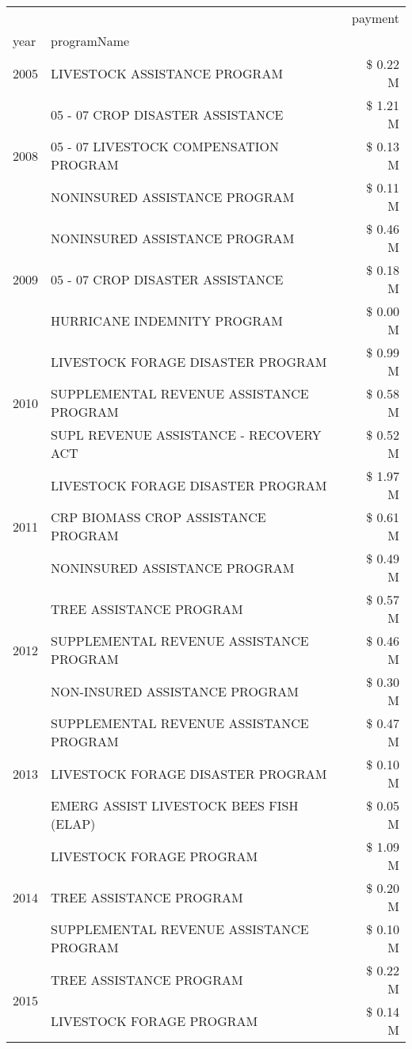 \begin{tabular}{llr}
\toprule
 &  & payment \\
year & programName &  \\
\midrule
2005 & LIVESTOCK ASSISTANCE PROGRAM & \$ 0.22 M \\
\cline{1-3}
\multirow[t]{3}{*}{2008} & 05 - 07 CROP DISASTER ASSISTANCE & \$ 1.21 M \\
 & 05 - 07 LIVESTOCK COMPENSATION PROGRAM & \$ 0.13 M \\
 & NONINSURED ASSISTANCE PROGRAM & \$ 0.11 M \\
\cline{1-3}
\multirow[t]{3}{*}{2009} & NONINSURED ASSISTANCE PROGRAM & \$ 0.46 M \\
 & 05 - 07 CROP DISASTER ASSISTANCE & \$ 0.18 M \\
 & HURRICANE INDEMNITY PROGRAM & \$ 0.00 M \\
\cline{1-3}
\multirow[t]{3}{*}{2010} & LIVESTOCK FORAGE DISASTER PROGRAM & \$ 0.99 M \\
 & SUPPLEMENTAL REVENUE ASSISTANCE PROGRAM & \$ 0.58 M \\
 & SUPL REVENUE ASSISTANCE - RECOVERY ACT & \$ 0.52 M \\
\cline{1-3}
\multirow[t]{3}{*}{2011} & LIVESTOCK FORAGE DISASTER PROGRAM & \$ 1.97 M \\
 & CRP BIOMASS CROP ASSISTANCE PROGRAM & \$ 0.61 M \\
 & NONINSURED ASSISTANCE PROGRAM & \$ 0.49 M \\
\cline{1-3}
\multirow[t]{3}{*}{2012} & TREE ASSISTANCE PROGRAM & \$ 0.57 M \\
 & SUPPLEMENTAL REVENUE ASSISTANCE PROGRAM & \$ 0.46 M \\
 & NON-INSURED ASSISTANCE PROGRAM & \$ 0.30 M \\
\cline{1-3}
\multirow[t]{3}{*}{2013} & SUPPLEMENTAL REVENUE ASSISTANCE PROGRAM & \$ 0.47 M \\
 & LIVESTOCK FORAGE DISASTER PROGRAM & \$ 0.10 M \\
 & EMERG ASSIST LIVESTOCK BEES FISH (ELAP) & \$ 0.05 M \\
\cline{1-3}
\multirow[t]{3}{*}{2014} & LIVESTOCK FORAGE PROGRAM & \$ 1.09 M \\
 & TREE ASSISTANCE PROGRAM & \$ 0.20 M \\
 & SUPPLEMENTAL REVENUE ASSISTANCE PROGRAM & \$ 0.10 M \\
\cline{1-3}
\multirow[t]{3}{*}{2015} & TREE ASSISTANCE PROGRAM & \$ 0.22 M \\
 & LIVESTOCK FORAGE PROGRAM & \$ 0.14 M \\

\end{tabular}

